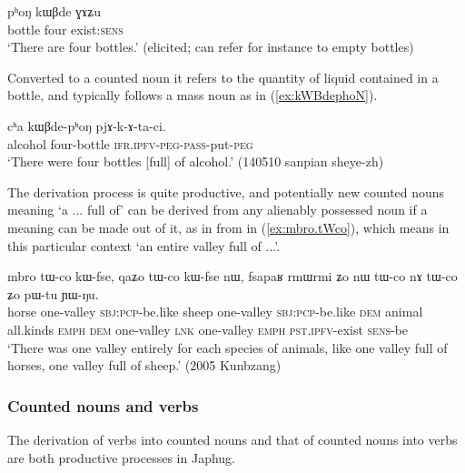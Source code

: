 \begin{exe}
\ex \label{ex:phoN}
\gll  pʰoŋ kɯβde ɣɤʑu \\
bottle four exist:\textsc{sens} \\
\glt `There are four bottles.' (elicited; can refer for instance to empty bottles)
\end{exe}

Converted to a counted noun  it refers to the quantity of liquid contained in a bottle, and typically follows a mass noun as in (\ref{ex:kWBdephoN}).

\begin{exe}
\ex \label{ex:kWBdephoN}
\gll cʰa kɯβde-pʰoŋ pjɤ-k-ɤ-ta-ci. \\
alcohol four-bottle \textsc{ifr}.\textsc{ipfv}-\textsc{peg}-\textsc{pass}-put-\textsc{peg} \\
\glt  `There were four bottles [full] of alcohol.' (140510 sanpian sheye-zh)
\end{exe}

The derivation process is quite productive, and potentially new counted nouns meaning `a ... full of' can be derived from any alienably possessed noun if a meaning can be made out of it, as in  from  in (\ref{ex:mbro.tWco}), which means in this particular context `an entire valley full of ...'.
 
 \begin{exe}
\ex \label{ex:mbro.tWco}
 \gll  mbro tɯ-co kɯ-fse, qaʑo tɯ-co kɯ-fse nɯ, fsapaʁ rmɯrmi ʑo nɯ tɯ-co nɤ tɯ-co ʑo pɯ-tu ɲɯ-ŋu. \\
 horse one-valley \textsc{sbj}:\textsc{pcp}-be.like  sheep one-valley \textsc{sbj}:\textsc{pcp}-be.like \textsc{dem} animal all.kinds \textsc{emph} \textsc{dem}  one-valley \textsc{lnk}  one-valley \textsc{emph} \textsc{pst}.\textsc{ipfv}-exist \textsc{sens}-be \\
 \glt `There was one valley entirely for each species of animals, like one valley full of horses, one valley full of sheep.' (2005 Kunbzang)
 \end{exe}
 
\subsubsection{Counted nouns and verbs}   \label{sec:CN.verbs}
The derivation of verbs into counted nouns and that of counted nouns into verbs are both productive processes in Japhug. 

